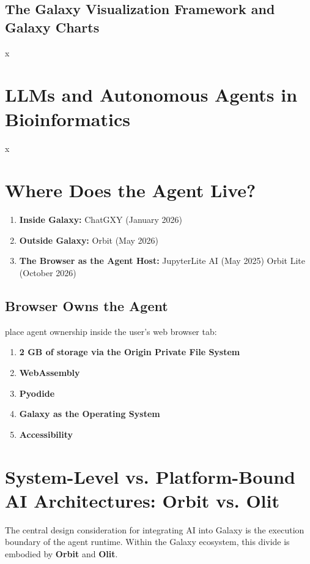 \subsection{The Galaxy Visualization Framework and Galaxy Charts}
x

\section{LLMs and Autonomous Agents in Bioinformatics}
\label{sec:llm_agents}
x

\section{Where Does the Agent Live?}
\label{sec:galaxy_ai_evolution}

\begin{enumerate}
    \item \textbf{Inside Galaxy:} ChatGXY (January 2026)
    \item \textbf{Outside Galaxy:} Orbit (May 2026) 
    \item \textbf{The Browser as the Agent Host:} JupyterLite AI (May 2025) Orbit Lite (October 2026)
\end{enumerate}

\subsection{Browser Owns the Agent}
\label{sec:browser_owns_agent}

place agent ownership inside the user's web browser tab:

\begin{enumerate}
    \item \textbf{2 GB of storage via the Origin Private File System}
    \item \textbf{WebAssembly} 
    \item \textbf{Pyodide}
    \item \textbf{Galaxy as the Operating System}
    \item \textbf{Accessibility}
\end{enumerate}

\section{System-Level vs. Platform-Bound AI Architectures: Orbit vs. Olit}
\label{sec:orbit_vs_olit_deep}

The central design consideration for integrating AI into Galaxy is the execution boundary of the agent runtime. Within the Galaxy ecosystem, this divide is embodied by \textbf{Orbit} and \textbf{Olit}.

